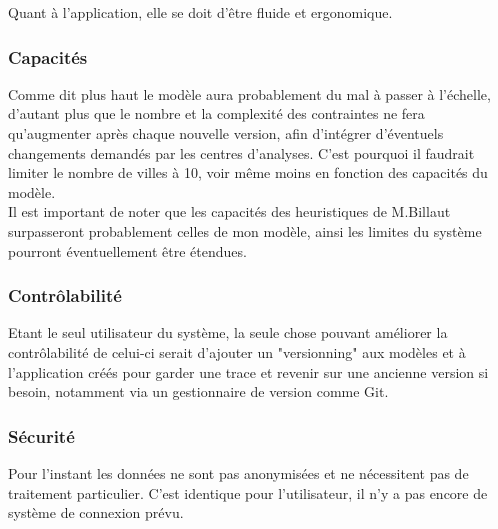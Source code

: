 \documentclass{polytech/polytech}
\numberwithin{figure}{chapter}
\begin{document}
\begin{appendix}
Quant à l'application, elle se doit d'être fluide et ergonomique.

\subsubsection{Capacités}
Comme dit plus haut le modèle aura probablement du mal à passer à l'échelle, d'autant plus que le nombre et la complexité des contraintes ne fera qu'augmenter après chaque nouvelle version, afin d'intégrer d'éventuels changements demandés par les centres d'analyses. C'est pourquoi il faudrait limiter le nombre de villes à 10, voir même moins en fonction des capacités du modèle.\\

Il est important de noter que les capacités des heuristiques de M.Billaut surpasseront probablement celles de mon modèle, ainsi les limites du système pourront éventuellement être étendues.

\subsubsection{Contrôlabilité}
Etant le seul utilisateur du système, la seule chose pouvant améliorer la contrôlabilité de celui-ci serait d'ajouter un "versionning" aux modèles et à l'application créés pour garder une trace et revenir sur une ancienne version si besoin, notamment via un gestionnaire de version comme Git.

\subsubsection{Sécurité}
Pour l'instant les données ne sont pas anonymisées et ne nécessitent pas de traitement particulier. C'est identique pour l'utilisateur, il n'y a pas encore de système de connexion prévu.

\end{appendix}
\end{document}
